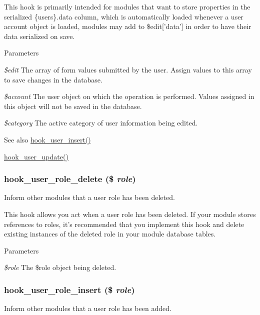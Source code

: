 This hook is primarily intended for modules that want to store properties in the serialized \{users\}.data column, which is automatically loaded whenever a user account object is loaded, modules may add to \$edit\mbox{[}'data'\mbox{]} in order to have their data serialized on save.


\begin{DoxyParams}{Parameters}
\item[{\em \$edit}]The array of form values submitted by the user. Assign values to this array to save changes in the database. \item[{\em \$account}]The user object on which the operation is performed. Values assigned in this object will not be saved in the database. \item[{\em \$category}]The active category of user information being edited.\end{DoxyParams}
\begin{DoxySeeAlso}{See also}
\hyperlink{group__hooks_gaa3e2c4c972ee796d216b15da7aaf9c2c}{hook\_\-user\_\-insert()} 

\hyperlink{group__hooks_gab71262402336071ef7c3d08f4c36e887}{hook\_\-user\_\-update()} 
\end{DoxySeeAlso}
\hypertarget{group__hooks_gaf2a69f678861a227e36de13b87c340a7}{
\subsubsection[{hook\_\-user\_\-role\_\-delete}]{\setlength{\rightskip}{0pt plus 5cm}hook\_\-user\_\-role\_\-delete (\$ {\em role})}}
\label{group__hooks_gaf2a69f678861a227e36de13b87c340a7}
Inform other modules that a user role has been deleted.

This hook allows you act when a user role has been deleted. If your module stores references to roles, it's recommended that you implement this hook and delete existing instances of the deleted role in your module database tables.


\begin{DoxyParams}{Parameters}
\item[{\em \$role}]The \$role object being deleted. \end{DoxyParams}
\hypertarget{group__hooks_ga79141c13b24e953eac78d810b530e96e}{
\subsubsection[{hook\_\-user\_\-role\_\-insert}]{\setlength{\rightskip}{0pt plus 5cm}hook\_\-user\_\-role\_\-insert (\$ {\em role})}}
\label{group__hooks_ga79141c13b24e953eac78d810b530e96e}
Inform other modules that a user role has been added.

